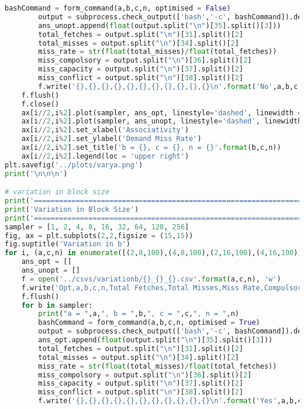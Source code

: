\documentclass[12pt, a4paper]{article}
\begin{document}
\begin{lstlisting}[language=Python]
		bashCommand = form_command(a,b,c,n, optimised = False)
		output = subprocess.check_output(['bash','-c', bashCommand]).decode('utf8')
		ans_unopt.append(float(output.split("\n")[35].split()[3]))
		total_fetches = output.split("\n")[31].split()[2]
		total_misses = output.split("\n")[34].split()[2]
		miss_rate = str(float(total_misses)/float(total_fetches))
		miss_compolsory = output.split("\n")[36].split()[2]
		miss_capacity = output.split("\n")[37].split()[2]
		miss_conflict = output.split("\n")[38].split()[2]
		f.write('{},{},{},{},{},{},{},{},{},{},{}\n'.format('No',a,b,c,n,total_fetches,total_misses,miss_rate,miss_compolsory,miss_conflict,miss_capacity))
	f.flush()
	f.close()
	ax[i//2,i%2].plot(sampler, ans_opt, linestyle='dashed', linewidth = 2, marker='o', markersize=4,label='optimised')
	ax[i//2,i%2].plot(sampler, ans_unopt, linestyle='dashed', linewidth = 2, marker='o', markersize=4,label='unoptimised')
	ax[i//2,i%2].set_xlabel('Associativity')
	ax[i//2,i%2].set_ylabel('Demand Miss Rate')
	ax[i//2,i%2].set_title('b = {}, c = {}, n = {}'.format(b,c,n))
	ax[i//2,i%2].legend(loc = 'upper right')
plt.savefig('../plots/varya.png')
print('\n\n\n')

# variation in block size
print('==============================================================================')
print('Variation in Block Size')
print('==============================================================================')
sampler = [1, 2, 4, 8, 16, 32, 64, 128, 256]
fig, ax = plt.subplots(2,2,figsize = (15,15))
fig.suptitle('Variation in b')
for i, (a,c,n) in enumerate([(2,8,100),(4,8,100),(2,16,100),(4,16,100)]):
	ans_opt = []
	ans_unopt = []
	f = open('../csvs/variationb/{}_{}_{}.csv'.format(a,c,n), 'w')
	f.write('Opt,a,b,c,n,Total Fetches,Total Misses,Miss Rate,Compulsory miss, Conflict miss, Capacity miss\n')
	f.flush()
	for b in sampler:
		print("a = ",a,", b = ",b,", c = ",c,", n = ",n)
		bashCommand = form_command(a,b,c,n, optimised = True)
		output = subprocess.check_output(['bash','-c', bashCommand]).decode('utf8')
		ans_opt.append(float(output.split("\n")[35].split()[3]))
		total_fetches = output.split("\n")[31].split()[2]
		total_misses = output.split("\n")[34].split()[2]
		miss_rate = str(float(total_misses)/float(total_fetches))
		miss_compolsory = output.split("\n")[36].split()[2]
		miss_capacity = output.split("\n")[37].split()[2]
		miss_conflict = output.split("\n")[38].split()[2]
		f.write('{},{},{},{},{},{},{},{},{},{},{}\n'.format('Yes',a,b,c,n,total_fetches,total_misses,miss_rate,miss_compolsory,miss_conflict,miss_capacity))


\end{lstlisting}
\end{document}
